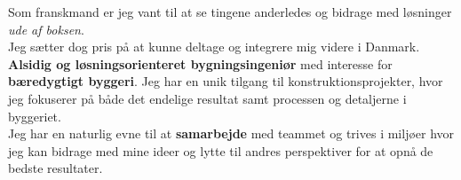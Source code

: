 %
%
%
\par{Som franskmand er jeg vant til at se tingene anderledes og bidrage med løsninger \textit{ude af boksen}.\\
Jeg sætter dog pris på at kunne deltage og integrere mig videre i Danmark.\\
\textbf{Alsidig og løsningsorienteret bygningsingeniør} med interesse for \textbf{bæredygtigt byggeri}. Jeg har en unik tilgang til konstruktionsprojekter, hvor jeg fokuserer på både det endelige resultat samt processen og detaljerne i byggeriet.\\
Jeg har en naturlig evne til at \textbf{samarbejde} med teammet og trives i miljøer hvor jeg kan bidrage med mine ideer og lytte til andres perspektiver for at opnå de bedste resultater.}
